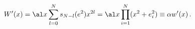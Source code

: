 \begin{equation}
W^{\prime }(x)=\al x\sum_{l=0}^{N}s_{N-l}(e^{2})x^{2l}=\al %
x\prod_{i=1}^{N}(x^{2}+e_{i}^{2})\equiv \alpha w^{\prime }(x)\,.
\end{equation}


